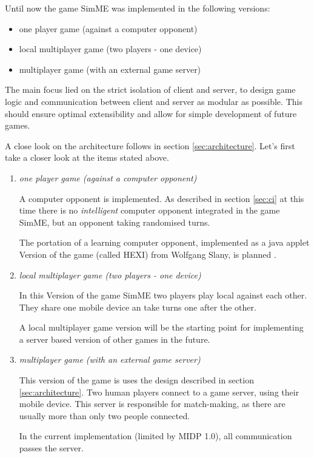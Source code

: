 	Until now the game SimME was implemented in the following versions:

	\begin{itemize}
		\item one player game (against a computer opponent)
		\item local multiplayer game (two players - one device)
		\item multiplayer game (with an external game server)
	\end{itemize}

	The main focus lied on the strict isolation of client and server, to design
	game logic and communication between client and server as modular as
	possible. This should ensure optimal extensibility and allow for simple
	development of future games.
	
	A close look on the architecture follows in section \ref{sec:architecture}.
	Let's first take a closer look at the items stated above.
	
	\begin{enumerate}
	
		\item \textit{one player game (against a computer opponent)}
		
			A computer opponent is implemented. As described in section
			\ref{sec:ci} at this time there is no \textit{intelligent} computer
			opponent integrated in the game SimME, but an opponent taking
			randomised turns.
			
			The portation of a learning computer opponent, implemented as a java
			applet Version of the game (called HEXI) from Wolfgang Slany, is
			planned \cite{slany_paper}.
			
		\item \textit{local multiplayer game (two players - one device)}
		
			In this Version of the game SimME two players play local against
			each other. They share one mobile device an take turns one after the
			other.
			
			A local multiplayer game version will be the starting point
			for implementing a server based version of other games in the
			future.
			
		\item \textit{multiplayer game (with an external game server)}
		
			This version of the game is uses the design described in section
			\ref{sec:architecture}. Two human players connect to a game server,
			using their mobile device. This server is responsible for
			match-making, as there are usually more than only two people
			connected.
			
			In the current implementation (limited by MIDP 1.0), all
			communication passes the server.
			
	\end{enumerate}
	
